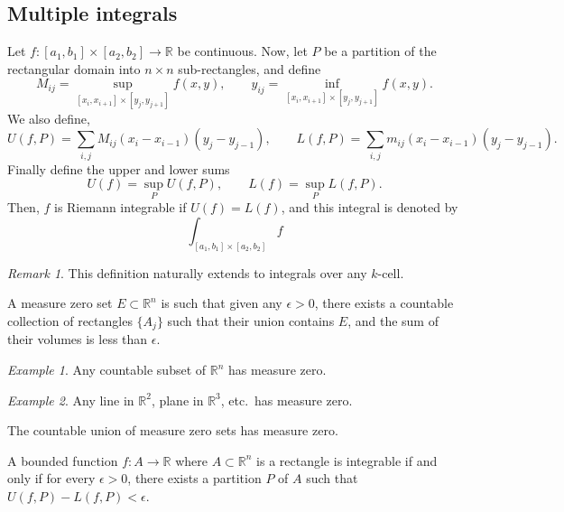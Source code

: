 \documentclass[11pt]{article}
\newcommand{\R}{\mathbb{R}}
\theoremstyle{definition}
\theoremstyle{remark}
\newtheorem*{remark}{Remark}
\newtheorem*{example}{Example}
\numberwithin{equation}{section}
\begin{document}
    \subsection{Multiple integrals}
    \begin{definition}
        Let $f\colon [a_1, b_1]\times [a_2, b_2] \to \R$ be continuous. Now, let
        $P$ be a partition of the rectangular domain into $n \times n$
        sub-rectangles, and define \[
            M_{ij} = \sup_{[x_{i}, x_{i + 1}]\times [y_{j}, y_{j + 1}]} f(x, y), \qquad
            y_{ij} = \inf_{[x_{i}, x_{i + 1}]\times [y_{j}, y_{j + 1}]} f(x, y).
        \] We also define, \[
            U(f, P) = \sum_{i, j} M_{ij}(x_i - x_{i - 1})(y_j - y_{j - 1}), \qquad 
            L(f, P) = \sum_{i, j} m_{ij}(x_i - x_{i - 1})(y_j - y_{j - 1}).
        \] Finally define the upper and lower sums \[
            U(f) = \sup_{P} U(f, P), \qquad
            L(f) = \sup_{P} L(f, P).
        \] Then, $f$ is Riemann integrable if $U(f) = L(f)$, and this integral is
        denoted by \[
            \int_{[a_1, b_1] \times [a_2, b_2]} f
        \] 

        \begin{remark}
            This definition naturally extends to integrals over any $k$-cell.
        \end{remark}
    \end{definition}


    \begin{definition}
        A measure zero set $E \subset \R^n$ is such that given any $\epsilon > 0$,
        there exists a countable collection of rectangles $\{A_j\}$ such that their
        union contains $E$, and the sum of their volumes is less than $\epsilon$.
    \end{definition}
    \begin{example}
        Any countable subset of $\R^n$ has measure zero.
    \end{example}
    \begin{example}
        Any line in $\R^2$, plane in $\R^3$, etc.\ has measure zero.
    \end{example}

    \begin{lemma}
        The countable union of measure zero sets has measure zero.
    \end{lemma}

    \begin{theorem}
        A bounded function $f\colon A \to \R$ where $A \subset \R^n$ is a rectangle
        is integrable if and only if for every $\epsilon > 0$, there exists a
        partition $P$ of $A$ such that $U(f, P) - L(f, P) < \epsilon$.
    \end{theorem}
\end{document}
